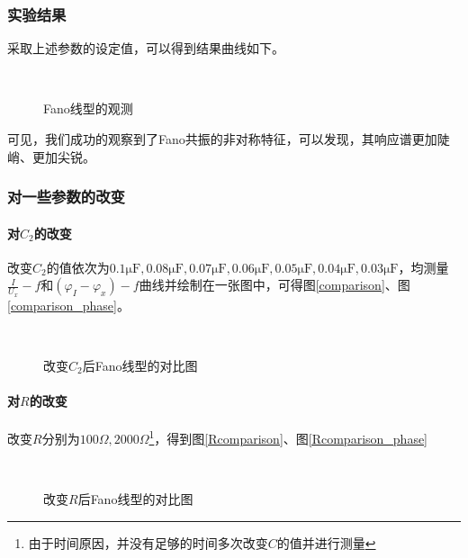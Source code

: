 \documentclass{ctexart}
\begin{document}
	\subsubsection{实验结果}
	采取上述参数的设定值，可以得到结果曲线如下。
	\begin{figure}[H]
		\centering
		\\
		\caption{Fano线型的观测}
	\end{figure}
	可见，我们成功的观察到了Fano共振的非对称特征，可以发现，其响应谱更加陡峭、更加尖锐。
	\subsubsection{对一些参数的改变}
	\paragraph{对$C_2$的改变}
	改变$C_2$的值依次为$0.1\mathrm{\mu F},0.08\mathrm{\mu F},0.07\mathrm{\mu F},0.06\mathrm{\mu F},0.05\mathrm{\mu F},0.04\mathrm{\mu F},0.03\mathrm{\mu F}$，均测量$\frac{I}{U_x}-f$和$(\varphi_I-\varphi_x)-f$曲线并绘制在一张图中，可得图\ref{comparison}、图\ref{comparison_phase}。
	\begin{figure}[H]
		\centering
		\\
		\caption{改变$C_2$后Fano线型的对比图}
	\end{figure}
	\paragraph{对$R$的改变}
	改变$R$分别为$100\Omega,2000\Omega$\footnote{由于时间原因，并没有足够的时间多次改变$C$的值并进行测量}，得到图\ref{Rcomparison}、图\ref{Rcomparison_phase}
	\begin{figure}[H]
		\centering
		\\
		\caption{改变$R$后Fano线型的对比图}
	\end{figure}
\end{document}
